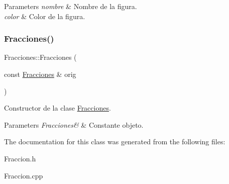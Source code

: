 \begin{DoxyParams}{Parameters}
{\em nombre} & Nombre de la figura. \\
\hline
{\em color} & Color de la figura. \\
\hline
\end{DoxyParams}
\hypertarget{class_fracciones_a211a40600cc66d68cbb1f3d7298b08b2}{}\label{class_fracciones_a211a40600cc66d68cbb1f3d7298b08b2} 
\subsubsection{\texorpdfstring{Fracciones()}{Fracciones()}\hspace{0.1cm}{\footnotesize\ttfamily [2/2]}}
{\ttfamily Fracciones\+::\+Fracciones (\begin{DoxyParamCaption}\item[{const \hyperlink{class_fracciones}{Fracciones} \&}]{orig }\end{DoxyParamCaption})}



Constructor de la clase \hyperlink{class_fracciones}{Fracciones}. 


\begin{DoxyParams}{Parameters}
{\em Fracciones\&} & Constante objeto. \\
\hline
\end{DoxyParams}


The documentation for this class was generated from the following files\+:\begin{DoxyCompactItemize}
\item 
Fraccion.\+h\item 
Fraccion.\+cpp\end{DoxyCompactItemize}
